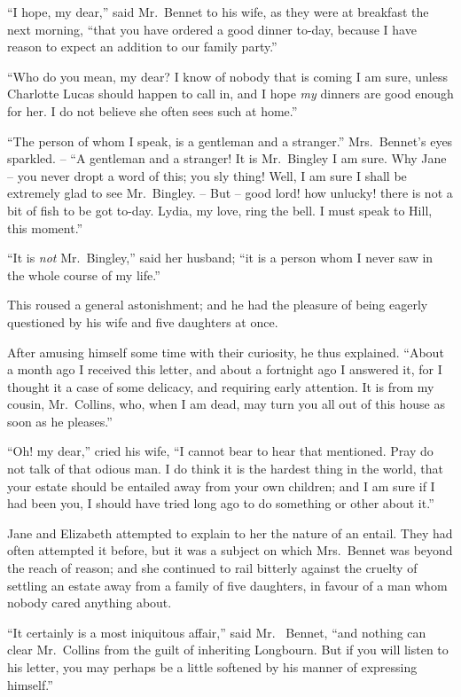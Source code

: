 
“I hope, my dear,” said Mr.\ Bennet to his wife, as
they were at breakfast the next morning, “that you have
ordered a good dinner to-day, because I have reason to
expect an addition to our family party.”

“Who do you mean, my dear? I know of nobody that
is coming I am sure, unless Charlotte Lucas should happen
to call in, and I hope \textit{my} dinners are good enough for her.
I do not believe she often sees such at home.”

“The person of whom I speak, is a gentleman and a
stranger.” Mrs.\ Bennet’s eyes sparkled. -- “A gentleman
and a stranger! It is Mr.\ Bingley I am sure. Why Jane
-- you never dropt a word of this; you sly thing! Well,
I am sure I shall be extremely glad to see Mr.\ Bingley. --
But -- good lord! how unlucky! there is not a bit of fish
to be got to-day. Lydia, my love, ring the bell. I must
speak to Hill, this moment.”

“It is \textit{not} Mr.\ Bingley,” said her husband; “it is
a person whom I never saw in the whole course of my
life.”

This roused a general astonishment; and he had the
pleasure of being eagerly questioned by his wife and five
daughters at once.

After amusing himself some time with their curiosity,
he thus explained. “About a month ago I received this
letter, and about a fortnight ago I answered it, for I
thought it a case of some delicacy, and requiring early
attention. It is from my cousin, Mr.\ Collins, who, when
I am dead, may turn you all out of this house as soon as
he pleases.”

“Oh! my dear,” cried his wife, “I cannot bear to
hear that mentioned. Pray do not talk of that odious
man. I do think it is the hardest thing in the world, that
your estate should be entailed away from your own
children; and I am sure if I had been you, I should have
tried long ago to do something or other about it.”

Jane and Elizabeth attempted to explain to her the
nature of an entail. They had often attempted it before,
but it was a subject on which Mrs.\ Bennet was beyond
the reach of reason; and she continued to rail bitterly
against the cruelty of settling an estate away from a family
of five daughters, in favour of a man whom nobody cared
anything about.

“It certainly is a most iniquitous affair,” said Mr.\ %
Bennet, “and nothing can clear Mr.\ Collins from the guilt
of inheriting Longbourn. But if you will listen to his
letter, you may perhaps be a little softened by his manner
of expressing himself.”

